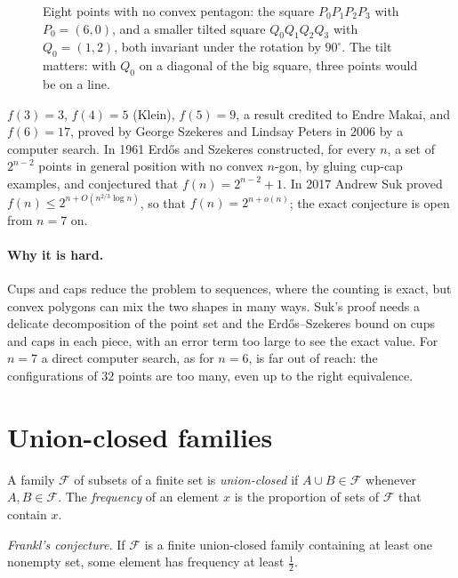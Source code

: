 \begin{figure}[ht]
\centering
{}
\caption{Eight points with no convex pentagon: the square $P_0P_1P_2P_3$ with $P_0=(6,0)$, and a smaller tilted square $Q_0Q_1Q_2Q_3$ with
$Q_0=(1,2)$, both invariant under the rotation by $90^\circ$. The tilt matters: with $Q_0$ on a diagonal of the big square, three points would be on a
line.}
\label{fig:eight}
\end{figure}

\begin{remark}\label{rem:esz}
$f(3)=3$, $f(4)=5$ (Klein), $f(5)=9$, a result credited to Endre Makai, and $f(6)=17$, proved by George Szekeres and Lindsay Peters in 2006 by a computer
search. In 1961 Erd\H os and Szekeres constructed, for every $n$, a set of $2^{n-2}$ points in general position with no convex $n$-gon, by gluing
cup-cap examples, and conjectured that $f(n)=2^{n-2}+1$. In 2017 Andrew Suk proved $f(n)\le2^{n+O(n^{2/3}\log n)}$, so that $f(n)=2^{n+o(n)}$; the
exact conjecture is open from $n=7$ on.
\end{remark}

\paragraph{Why it is hard.} Cups and caps reduce the problem to sequences, where the counting is exact, but convex polygons can mix the two shapes in
many ways. Suk's proof needs a delicate decomposition of the point set and the Erd\H os--Szekeres bound on cups and caps in each piece, with an error
term too large to see the exact value. For $n=7$ a direct computer search, as for $n=6$, is far out of reach: the configurations of $32$ points are too
many, even up to the right equivalence.

\section{Union-closed families}

A family $\mathcal F$ of subsets of a finite set is \emph{union-closed} if $A\cup B\in\mathcal F$ whenever $A,B\in\mathcal F$. The \emph{frequency} of an
element $x$ is the proportion of sets of $\mathcal F$ that contain $x$.

\begin{center}
\emph{Frankl's conjecture.} If $\mathcal F$ is a finite union-closed family containing at least one nonempty set, some element has frequency at least
$\frac12$.
\end{center}

